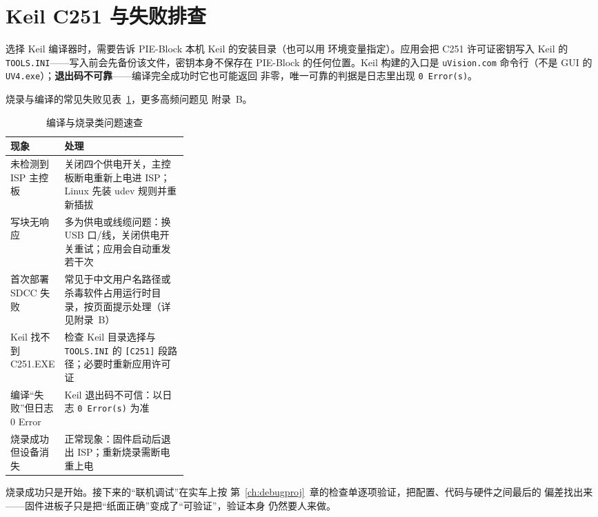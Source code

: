 \section{Keil C251 与失败排查}

选择 Keil 编译器时，需要告诉 PIE-Block 本机 Keil 的安装目录（也可以用
环境变量指定）。应用会把 C251 许可证密钥写入 Keil 的
\texttt{TOOLS.INI}——写入前会先备份该文件，密钥本身不保存在 PIE-Block
的任何位置。Keil 构建的入口是 \texttt{uVision.com} 命令行（不是 GUI 的
\texttt{UV4.exe}）；\textbf{退出码不可靠}——编译完全成功时它也可能返回
非零，唯一可靠的判据是日志里出现 \texttt{0 Error(s)}。

烧录与编译的常见失败见表~\ref{tab:ch09-trouble}，更多高频问题见
附录~B。

\begin{table}[htbp]
  \centering
  \small
  \begin{tabularx}{\linewidth}{@{}>{\raggedright\arraybackslash}p{0.30\linewidth} >{\raggedright\arraybackslash}X@{}}
    \toprule
    现象 & 处理 \\
    \midrule
    未检测到 ISP 主控板 & 关闭四个供电开关，主控板断电重新上电进 ISP；Linux 先装 udev 规则并重新插拔 \\
    写块无响应 & 多为供电或线缆问题：换 USB 口/线，关闭供电开关重试；应用会自动重发若干次 \\
    首次部署 SDCC 失败 & 常见于中文用户名路径或杀毒软件占用运行时目录，按页面提示处理（详见附录~B） \\
    Keil 找不到 C251.EXE & 检查 Keil 目录选择与 \texttt{TOOLS.INI} 的 \texttt{[C251]} 段路径；必要时重新应用许可证 \\
    编译“失败”但日志 0 Error & Keil 退出码不可信：以日志 \texttt{0 Error(s)} 为准 \\
    烧录成功但设备消失 & 正常现象：固件启动后退出 ISP；重新烧录需断电重上电 \\
    \bottomrule
  \end{tabularx}
  \caption{编译与烧录类问题速查}
  \label{tab:ch09-trouble}
\end{table}

烧录成功只是开始。接下来的“联机调试”在实车上按
第~\ref{ch:debugproj}~章的检查单逐项验证，把配置、代码与硬件之间最后的
偏差找出来——固件进板子只是把“纸面正确”变成了“可验证”，验证本身
仍然要人来做。
